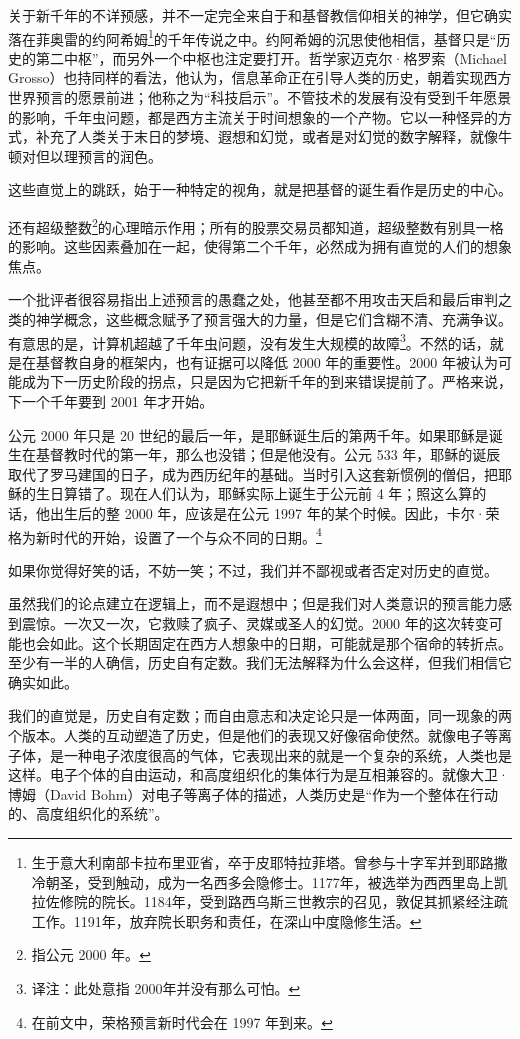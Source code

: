 关于新千年的不详预感，并不一定完全来自于和基督教信仰相关的神学，但它确实落在菲奥雷的约阿希姆\footnote{生于意大利南部卡拉布里亚省，卒于皮耶特拉菲塔。曾参与十字军并到耶路撒冷朝圣，受到触动，成为一名西多会隐修士。1177年，被选举为西西里岛上凯拉佐修院的院长。1184年，受到路西乌斯三世教宗的召见，敦促其抓紧经注疏工作。1191年，放弃院长职务和责任，在深山中度隐修生活。}的千年传说之中。约阿希姆的沉思使他相信，基督只是“历史的第二中枢”，而另外一个中枢也注定要打开。哲学家迈克尔·格罗索（Michael Grosso）也持同样的看法，他认为，信息革命正在引导人类的历史，朝着实现西方世界预言的愿景前进；他称之为“科技启示”。不管技术的发展有没有受到千年愿景的影响，千年虫问题，都是西方主流关于时间想象的一个产物。它以一种怪异的方式，补充了人类关于末日的梦境、遐想和幻觉，或者是对幻觉的数字解释，就像牛顿对但以理预言的润色。


这些直觉上的跳跃，始于一种特定的视角，就是把基督的诞生看作是历史的中心。


还有超级整数\footnote{指公元 2000 年。}的心理暗示作用；所有的股票交易员都知道，超级整数有别具一格的影响。这些因素叠加在一起，使得第二个千年，必然成为拥有直觉的人们的想象焦点。


一个批评者很容易指出上述预言的愚蠢之处，他甚至都不用攻击天启和最后审判之类的神学概念，这些概念赋予了预言强大的力量，但是它们含糊不清、充满争议。有意思的是，计算机超越了千年虫问题，没有发生大规模的故障\footnote{译注：此处意指 2000年并没有那么可怕。}。不然的话，就是在基督教自身的框架内，也有证据可以降低 2000 年的重要性。2000 年被认为可能成为下一历史阶段的拐点，只是因为它把新千年的到来错误提前了。严格来说，下一个千年要到 2001 年才开始。


公元 2000 年只是 20 世纪的最后一年，是耶稣诞生后的第两千年。如果耶稣是诞生在基督教时代的第一年，那么也没错；但是他没有。公元 533 年，耶稣的诞辰取代了罗马建国的日子，成为西历纪年的基础。当时引入这套新惯例的僧侣，把耶稣的生日算错了。现在人们认为，耶稣实际上诞生于公元前 4 年；照这么算的话，他出生后的整 2000 年，应该是在公元 1997 年的某个时候。因此，卡尔·荣格为新时代的开始，设置了一个与众不同的日期。\footnote{在前文中，荣格预言新时代会在 1997 年到来。}


如果你觉得好笑的话，不妨一笑；不过，我们并不鄙视或者否定对历史的直觉。


虽然我们的论点建立在逻辑上，而不是遐想中；但是我们对人类意识的预言能力感到震惊。一次又一次，它救赎了疯子、灵媒或圣人的幻觉。2000 年的这次转变可能也会如此。这个长期固定在西方人想象中的日期，可能就是那个宿命的转折点。至少有一半的人确信，历史自有定数。我们无法解释为什么会这样，但我们相信它确实如此。


我们的直觉是，历史自有定数；而自由意志和决定论只是一体两面，同一现象的两个版本。人类的互动塑造了历史，但是他们的表现又好像宿命使然。就像电子等离子体，是一种电子浓度很高的气体，它表现出来的就是一个复杂的系统，人类也是这样。电子个体的自由运动，和高度组织化的集体行为是互相兼容的。就像大卫·博姆（David Bohm）对电子等离子体的描述，人类历史是“作为一个整体在行动的、高度组织化的系统”。


